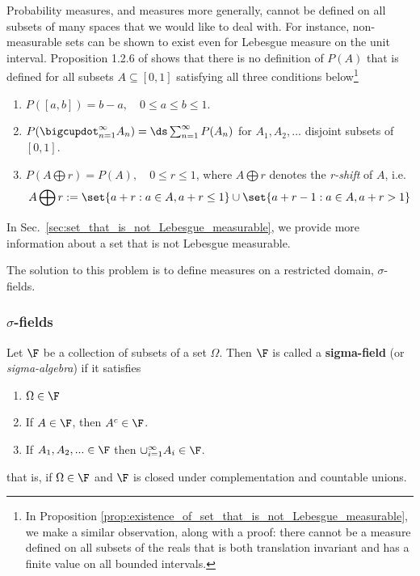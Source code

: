 \documentclass{article} %
\newcommand{\sfs}{$\sigma$-fields}
\begin{document}
Probability measures, and measures more generally, cannot be defined on all subsets of many spaces that we would like to deal with.  For instance, non-measurable sets can be shown to exist even for Lebesgue measure on the unit interval.  Proposition 1.2.6 of \cite{rosenthal2006first} shows that there is no definition of $P(A)$ that is defined for all subsets $A \subseteq [0,1]$ satisfying all three conditions below\footnote{In Proposition \ref{prop:existence_of_set_that_is_not_Lebesgue_measurable}, we make a similar observation, along with a proof: there cannot be a measure defined on all subsets of the reals that is both translation invariant and has a finite value on all bounded intervals.}
\begin{enumerate}
\item $P([a,b]) = b-a, \quad 0 \leq a \leq b \leq 1$.	
\item $P(\bigcupdot_{n=1}^\infty A_n ) = \ds\sum_{n=1}^\infty P(A_n)$ for $A_1, A_2, ...$ disjoint subsets of $[0,1]$.
\item $P(A \bigoplus r) = P(A), \quad 0 \leq r \leq 1$, where $A \bigoplus r$ denotes the \textit{r-shift} of $A$, i.e. 
\[ A \bigoplus r := \set{a+r : a \in A, a+r \leq 1} \cup \set{a+r-1 : a \in A, a +r >1}\]
\end{enumerate}
In Sec.~\ref{sec:set_that_is_not_Lebesgue_measurable}, we provide more information about a set that is not Lebesgue measurable.

The solution to this problem is to define measures on a restricted domain, $\sigma$-fields.

\subsubsection{$\sigma$-fields}





\begin{definition}
Let $\F$ be a collection of subsets of a set $\Omega$.  Then $\F$ is called a \textbf{sigma-field} (or \textit{sigma-algebra}) if it satisfies

\begin{enumerate}[label=\alph*)]
	\item $\Omega \in \F$ 
	\item If $A \in \F$, then $A^c \in \F$.
	\item If $A_1,A_2, ... \in \F$ then $\cup_{i=1}^\infty A_i \in \F$.  
\end{enumerate}
that is, if $\Omega \in \F$ and $\F$ is closed under complementation and countable unions.
\label{def:sigma_field}	
\end{definition}
\end{document}
